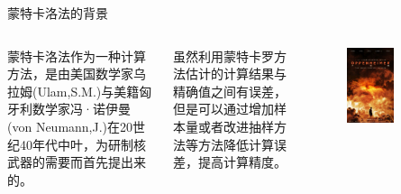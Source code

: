 \documentclass[xcolor=table,dvipsnames,svgnames,aspectratio=169,fontset=ubuntu]{ctexbeamer}
\begin{document}
\begin{frame}{蒙特卡洛法的背景}
  \begin{columns}
  蒙特卡洛法作为一种计算方法，是由美国数学家乌拉姆(Ulam,S.M.)与美籍匈牙利数学家冯·诺伊曼(von Neumann,J.)在20世纪40年代中叶，为研制核武器的需要而首先提出来的。

  \vskip 15pt
  虽然利用蒙特卡罗方法估计的计算结果与精确值之间有误差，但是可以通过增加样本量或者改进抽样方法等方法降低计算误差，提高计算精度。
  \begin{figure}
    \centering
    \includegraphics[width=0.6\textwidth]{abhm.jpeg}
  \end{figure}
\end{columns}
\end{frame}
\end{document}
